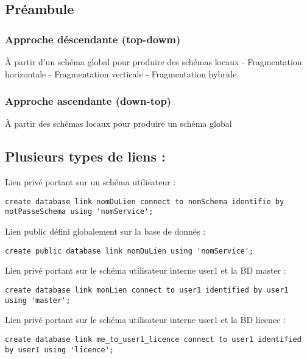 \subsection{Préambule}\label{pruxe9ambule}

\subsubsection{Approche déscendante
(top-dowm)}\label{approche-duxe9scendante-top-dowm}

À partir d'un schéma global pour produire des schémas locaux -
Fragmentation horizontale - Fragmentation verticale - Fragmentation
hybride

\subsubsection{Approche ascendante
(down-top)}\label{approche-ascendante-down-top}

À partir des schémas locaux pour produire un schéma global

\subsection{Plusieurs types de liens :}\label{plusieurs-types-de-liens}

Lien privé portant sur un schéma utilisateur :

\begin{verbatim}
create database link nomDuLien connect to nomSchema identifie by motPasseSchema using 'nomService';
\end{verbatim}

Lien public défini globalement sur la base de donnés :

\begin{verbatim}
create public database link nomDuLien using 'nomService';
\end{verbatim}

Lien privé portant sur le schéma utilisateur interne user1 et la BD
master :

\begin{verbatim}
create database link monLien connect to user1 identified by user1 using 'master';
\end{verbatim}

Lien privé portant sur le schéma utilisateur interne user1 et la BD
licence :

\begin{verbatim}
create database link me_to_user1_licence connect to user1 identified by user1 using 'licence';
\end{verbatim}

